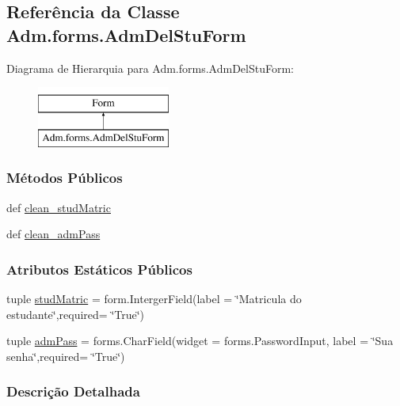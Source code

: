 \hypertarget{classAdm_1_1forms_1_1AdmDelStuForm}{\subsection{Referência da Classe Adm.\-forms.\-Adm\-Del\-Stu\-Form}
\label{classAdm_1_1forms_1_1AdmDelStuForm}
}
Diagrama de Hierarquia para Adm.\-forms.\-Adm\-Del\-Stu\-Form\-:\begin{figure}[H]
\begin{center}
\leavevmode
\includegraphics[height=2.000000cm]{db/db9/classAdm_1_1forms_1_1AdmDelStuForm}
\end{center}
\end{figure}
\subsubsection*{Métodos Públicos}
\begin{DoxyCompactItemize}
\item 
def \hyperlink{classAdm_1_1forms_1_1AdmDelStuForm_ad50237848b6ed6ec4d8f8b943549fa37}{clean\-\_\-stud\-Matric}
\item 
def \hyperlink{classAdm_1_1forms_1_1AdmDelStuForm_a7da16ff5ed24848a59a7256bf30ca62c}{clean\-\_\-adm\-Pass}
\end{DoxyCompactItemize}
\subsubsection*{Atributos Estáticos Públicos}
\begin{DoxyCompactItemize}
\item 
tuple \hyperlink{classAdm_1_1forms_1_1AdmDelStuForm_a9ab40744579cf679da8a3a922a29061c}{stud\-Matric} = form.\-Interger\-Field(label = \char`\"{}Matricula do estudante\char`\"{},required= \char`\"{}True\char`\"{})
\item 
tuple \hyperlink{classAdm_1_1forms_1_1AdmDelStuForm_aff2b1076da947f2f4415f985bdc46d18}{adm\-Pass} = forms.\-Char\-Field(widget = forms.\-Password\-Input, label = \char`\"{}Sua senha\char`\"{},required= \char`\"{}True\char`\"{})
\end{DoxyCompactItemize}


\subsubsection{Descrição Detalhada}


